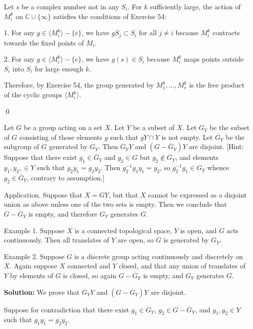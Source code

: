 Let $s$ be a complex number not in any $S_i$. For $k$ sufficiently large, the action of $M_i^k$ on $\mathbb{C} \cup \{\infty\}$ satisfies the conditions of Exercise 54:

1. For any $g \in \langle M_i^k \rangle - \{e\}$, we have $gS_j \subset S_i$ for all $j \neq i$ because $M_i^k$ contracts towards the fixed points of $M_i$.

2. For any $g \in \langle M_i^k \rangle - \{e\}$, we have $g(s) \in S_i$ because $M_i^k$ maps points outside $S_i$ into $S_i$ for large enough $k$.

Therefore, by Exercise 54, the group generated by $M_1^k, \ldots, M_r^k$ is the free product of the cyclic groups $\langle M_i^k \rangle$.


\qed
\begin{problembox}
Let $G$ be a group acting on a set $X$. Let $Y$ be a subset of $X$. Let $G_Y$ be the subset of $G$ consisting of those elements $g$ such that $gY \cap Y$ is not empty. Let $\overline{G}_Y$ be the subgroup of $G$ generated by $G_Y$. Then $\overline{G}_Y Y$ and $(G - \overline{G}_Y)Y$ are disjoint. [Hint: Suppose that there exist $g_1 \in \overline{G}_Y$ and $g_2 \in G$ but $g_2 \notin \overline{G}_Y$, and elements $y_1, y_2, \in Y$ such that $g_2y_1 = g_2y_2$. Then $g_2^{-1}g_1y_1 = y_2$, so $g_2^{-1}g_1 \in G_Y$ whence $g_2 \in \overline{G}_Y$, contrary to assumption.]

Application. Suppose that $X = GY$, but that $X$ cannot be expressed as a disjoint union as above unless one of the two sets is empty. Then we conclude that $G - \overline{G}_Y$ is empty, and therefore $G_Y$ generates $G$.

Example 1. Suppose $X$ is a connected topological space, $Y$ is open, and $G$ acts continuously. Then all translates of $Y$ are open, so $G$ is generated by $G_Y$.

Example 2. Suppose $G$ is a discrete group acting continuously and discretely on $X$. Again suppose $X$ connected and $Y$ closed, and that any union of translates of $Y$ by elements of $G$ is closed, so again $G - \overline{G}_Y$ is empty, and $G_Y$ generates $G$.
\end{problembox}

\noindent\textbf{Solution:} We prove that $\overline{G}_Y Y$ and $(G - \overline{G}_Y)Y$ are disjoint.

Suppose for contradiction that there exist $g_1 \in \overline{G}_Y$, $g_2 \in G - \overline{G}_Y$, and $y_1, y_2 \in Y$ such that $g_1y_1 = g_2y_2$.

